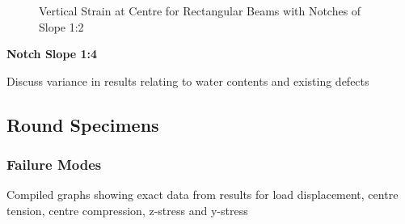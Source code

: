 \documentclass[11pt,a4paper]{article}
\numberwithin{equation}{subsection}
\begin{document}
\begin{figure}[h]
	\begin{center}
	\end{center}
	\caption{Vertical Strain at Centre for Rectangular Beams with Notches of Slope 1:2}
	\label{fig:Rect_12_Y}
\end{figure}

\vspace*{\baselineskip}

\noindent
\textbf{Notch Slope 1:4}\par
\noindent

\vspace*{\baselineskip}
\noindent Discuss variance in results relating to water contents and existing defects \par

\subsection{Round Specimens}
\subsubsection{Failure Modes}
\vspace*{\baselineskip}
\noindent Compiled graphs showing exact data from results for load displacement, centre tension, centre compression, z-stress and y-stress \par

\vspace*{\baselineskip}
\end{document}
